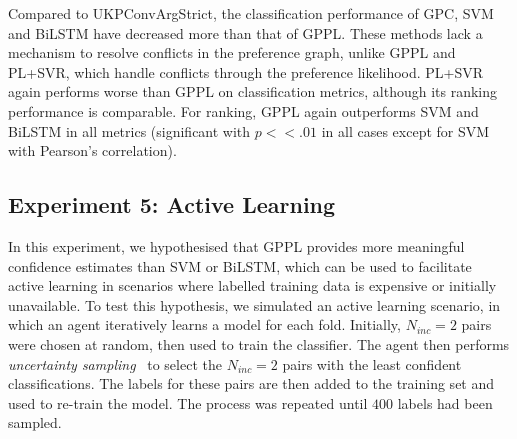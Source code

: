 Compared to UKPConvArgStrict, the classification performance of GPC, SVM and BiLSTM have decreased more than that of GPPL.
These methods lack a mechanism to resolve conflicts in the preference graph, unlike GPPL and PL+SVR, which handle conflicts through the preference likelihood.  
PL+SVR again performs worse than GPPL on classification metrics, although its ranking performance is comparable. 
For ranking, GPPL again outperforms SVM and BiLSTM in all metrics (significant with $p<<.01$ in all cases except for SVM with Pearson's correlation).

\subsection{Experiment 5: Active Learning}

In this experiment, we hypothesised that GPPL provides more meaningful confidence estimates than SVM or BiLSTM,
which can be used to facilitate active learning in scenarios where labelled training data is expensive
or initially unavailable.
To test this hypothesis, we simulated an active learning scenario, in which an agent 
iteratively learns a model for each fold. Initially, $N_{inc}=2$ pairs were chosen at random, then used to train the classifier. The agent then performs \emph{uncertainty sampling}~\cite{settles2010active} 
to select the $N_{inc}=2$ pairs with the least confident classifications. 
The labels for these pairs are then added to the training set and 
used to re-train the model. The process was repeated until $400$ labels had been sampled. 

